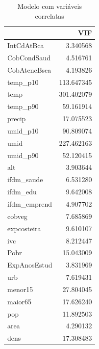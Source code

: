 \documentclass[12pt,a4paper]{article}\usepackage[]{graphicx}\usepackage[]{color}
\newenvironment{knitrout}{}{} %
\begin{document}
\begin{knitrout}
\color{fgcolor}\begin{table}[H]

\caption{\label{tab:unnamed-chunk-7}Modelo com variáveis correlatas}
\centering
\begin{tabular}[t]{l|r}
\hline
  & VIF\\
\hline
IntCdAtBca & 3.340568\\
\hline
CobCondSaud & 4.516761\\
\hline
CobAtencBsca & 4.193826\\
\hline
temp\_p10 & 113.647345\\
\hline
temp & 301.402079\\
\hline
temp\_p90 & 59.161914\\
\hline
precip & 17.075523\\
\hline
umid\_p10 & 90.809074\\
\hline
umid & 227.462163\\
\hline
umid\_p90 & 52.120415\\
\hline
alt & 3.903644\\
\hline
ifdm\_saude & 6.531280\\
\hline
ifdm\_edu & 9.642008\\
\hline
ifdm\_emprend & 4.907702\\
\hline
cobveg & 7.685869\\
\hline
expcosteira & 9.610107\\
\hline
ivc & 8.212447\\
\hline
Pobr & 15.043009\\
\hline
ExpAnosEstud & 3.831969\\
\hline
urb & 7.619431\\
\hline
menor15 & 27.804045\\
\hline
maior65 & 17.626240\\
\hline
pop & 11.892503\\
\hline
area & 4.290132\\
\hline
dens & 17.308483\\
\hline
\end{tabular}
\end{table}

\begin{table}[H]


\end{table}
\end{knitrout}
\end{document}
